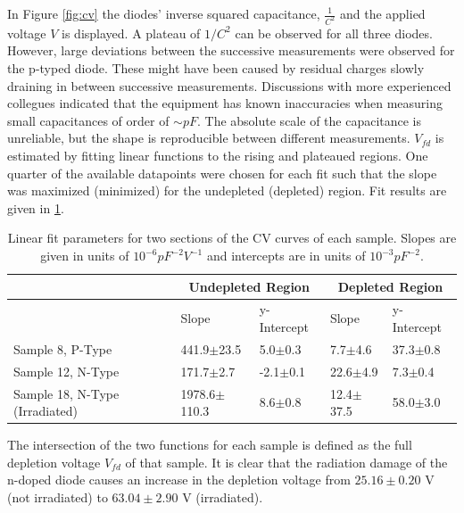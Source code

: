 \documentclass[11pt,a4paper]{report}
\begin{document}
In Figure \ref{fig:cv} the diodes' inverse squared capacitance, $\frac{1}{C^{2}}$ and the applied voltage $V$ is displayed.
A plateau of $1/C^2$ can be observed for all three diodes.
However, large deviations between the successive measurements were observed for the p-typed diode. These might have been caused by residual charges slowly draining in between successive measurements.
Discussions with more experienced collegues indicated that the equipment has known inaccuracies when measuring small capacitances of order of $\sim pF$. The absolute scale of the capacitance is unreliable, but the shape is reproducible between different measurements.
$V_{fd}$ is estimated by fitting linear functions to the rising and plateaued regions. One quarter of the available datapoints were chosen for each fit such that the slope was maximized (minimized) for the undepleted (depleted) region. Fit results are given in \ref{tab:fits}.

\begin{table}[h]
\centering
\caption{Linear fit parameters for two sections of the CV curves of each sample. Slopes are given in units of $10^{-6}pF^{-2}V^{-1}$ and intercepts are in units of $10^{-3}pF^{-2}$.}\label{tab:fits}
\begin{tabular}{lllll}
    \toprule
    & \multicolumn{2}{c}{Undepleted Region}   & \multicolumn{2}{c}{Depleted Region}  \\
    \midrule
    & Slope & y-Intercept & Slope & y-Intercept \\
    \midrule
    Sample 8, P-Type                & 441.9$\pm$23.5    & 5.0$\pm$0.3     & 7.7$\pm$4.6     & 37.3$\pm$0.8  \\
    Sample 12, N-Type               & 171.7$\pm$2.7     & -2.1$\pm$0.1    & 22.6$\pm$4.9    & 7.3$\pm$0.4   \\
    Sample 18, N-Type (Irradiated)  & 1978.6$\pm$110.3   & 8.6$\pm$0.8  & 12.4$\pm$37.5   & 58.0$\pm$3.0    \\
    \bottomrule
\end{tabular}
\end{table}

The intersection of the two functions for each sample is defined as the full depletion voltage $V_{fd}$ of that sample.
It is clear that the radiation damage of the n-doped diode causes an increase in the depletion voltage from $25.16\pm0.20$ V (not irradiated) to $63.04\pm2.90$ V (irradiated).
\end{document}
